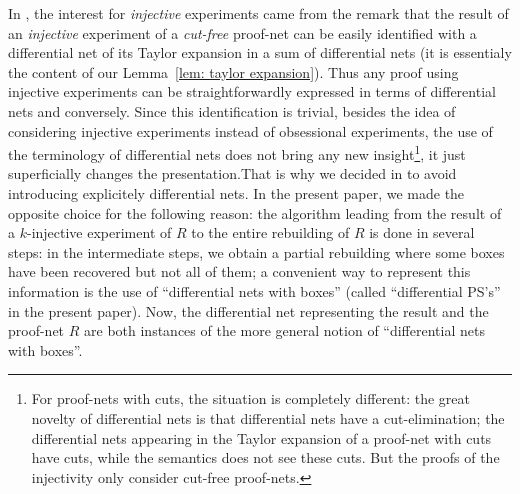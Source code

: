 \documentclass{article}
\theoremstyle{plain}
\begin{document}
In \cite{LPSinjectivity}, the interest for \emph{injective} experiments came from the remark that the result of an \emph{injective} experiment of a \emph{cut-free} proof-net can be easily identified with a differential net of its Taylor expansion in a sum of differential nets \cite{EhrhardRegnier:DiffNets} (it is essentialy the content of our Lemma~\ref{lem: taylor expansion}). Thus any proof using injective experiments can be straightforwardly expressed in terms of differential nets and conversely. Since this identification is trivial, besides the idea of considering injective experiments instead of obsessional experiments, the use of the terminology of differential nets does not bring any new insight\footnote{For proof-nets with cuts, the situation is completely different: the great novelty of differential nets is that differential nets have a cut-elimination; the differential nets appearing in the Taylor expansion of a proof-net with cuts have cuts, while the semantics does not see these cuts. But the proofs of the injectivity only consider cut-free proof-nets.}, it just superficially changes the presentation.That is why we decided in \cite{LPSinjectivity} to avoid introducing explicitely differential nets. In the present paper, we made the opposite choice for the following reason: 
the algorithm leading from the result of a $k$-injective experiment of $R$ to the entire rebuilding of $R$ is done in several steps: in the intermediate steps, we obtain a partial rebuilding where some boxes have been recovered but not all of them; a convenient way to represent this information is the use of ``differential nets with boxes'' (called ``differential PS's'' in the present paper). Now, the differential net representing the result and the proof-net $R$ are both instances of the more general notion of ``differential nets with boxes''.
\end{document}
